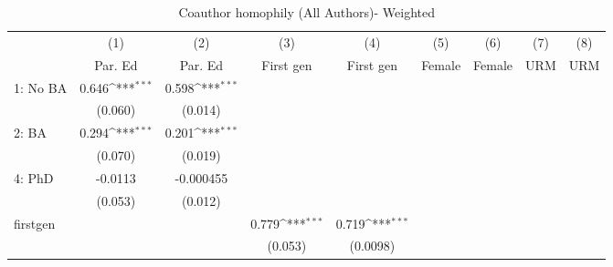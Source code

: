 \begin{table}[htbp]\centering
\def\sym#1{\ifmmode^{#1}\else\(^{#1}\)\fi}
\caption{Coauthor homophily (All Authors)- Weighted}
\begin{tabular}{l*{8}{c}}
\hline\hline
                    &\multicolumn{1}{c}{(1)}&\multicolumn{1}{c}{(2)}&\multicolumn{1}{c}{(3)}&\multicolumn{1}{c}{(4)}&\multicolumn{1}{c}{(5)}&\multicolumn{1}{c}{(6)}&\multicolumn{1}{c}{(7)}&\multicolumn{1}{c}{(8)}\\
                    &\multicolumn{1}{c}{Par. Ed}&\multicolumn{1}{c}{Par. Ed}&\multicolumn{1}{c}{First gen}&\multicolumn{1}{c}{First gen}&\multicolumn{1}{c}{Female}&\multicolumn{1}{c}{Female}&\multicolumn{1}{c}{URM}&\multicolumn{1}{c}{URM}\\
\hline
1: No BA            &       0.646\sym{***}&       0.598\sym{***}&                     &                     &                     &                     &                     &                     \\
                    &     (0.060)         &     (0.014)         &                     &                     &                     &                     &                     &                     \\
[1em]
2: BA               &       0.294\sym{***}&       0.201\sym{***}&                     &                     &                     &                     &                     &                     \\
                    &     (0.070)         &     (0.019)         &                     &                     &                     &                     &                     &                     \\
[1em]
4: PhD              &     -0.0113         &   -0.000455         &                     &                     &                     &                     &                     &                     \\
                    &     (0.053)         &     (0.012)         &                     &                     &                     &                     &                     &                     \\
[1em]
firstgen            &                     &                     &       0.779\sym{***}&       0.719\sym{***}&                     &                     &                     &                     \\
                    &                     &                     &     (0.053)         &    (0.0098)         &                     &                     &                     &                     \\

\end{tabular}
\end{table}
